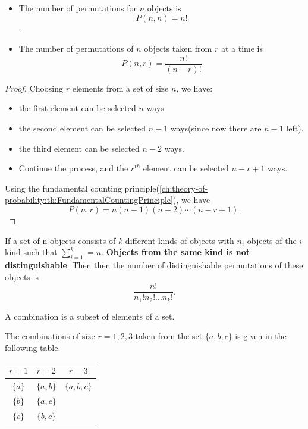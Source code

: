 \begin{refsection}
\begin{theorem}\hfill
	\begin{itemize}
		\item The number of permutations for $n$ objects is $$P(n,n) = n!$$.
		\item The number of permutations of $n$ objects taken from $r$ at a time is
		$$P(n,r) = \frac{n!}{(n-r)!}$$
	\end{itemize}
\end{theorem}
\begin{proof}
Choosing $r$ elements from a set of size $n$, we have:
\begin{itemize}
	\item the first element can be selected $n$ ways.
	\item the second element can be selected $n-1$ ways(since now there are $n-1$ left).
	\item the third element can be selected $n-2$ ways.
	\item Continue the process, and the $r^{th}$ element can be selected $n-r+1$ ways.
\end{itemize}	
Using the fundamental counting principle(\autoref{ch:theory-of-probability:th:FundamentalCountingPrinciple}), we have 
$$P(n,r) = n(n-1)(n-2)\cdots (n-r+1).$$
\end{proof}

\begin{lemma}
	If a set of n objects consists of $k$ different kinds of objects with $n_i$ objects of
	the $i$ kind such that $\sum_{i=1}^k = n$. \textbf{Objects from the same kind is not distinguishable}. Then then the number of distinguishable
	permutations of these objects is
	$$\frac{n!}{n_1!n_2!...n_k!}.$$
\end{lemma}

\begin{definition}[combination]
A combination is a subset of elements of a set.	
\end{definition}


\begin{example}
The combinations of size $r=1,2,3$ taken from the set $\{a,b,c\}$ is given in the following table.

\begin{center}
	\begin{tabular}{|c|c|c|}
		\hline
		$r=1$   & $r=2$     & $r=3$       \\ \hline
		$\{a\}$ & $\{a,b\}$ & $\{a,b,c\}$ \\ \hline
		$\{b\}$ & $\{a,c\}$ &             \\ \hline
		$\{c\}$ & $\{b,c\}$ &             \\ \hline
	\end{tabular}
\end{center}	
\end{example}



\end{refsection}
